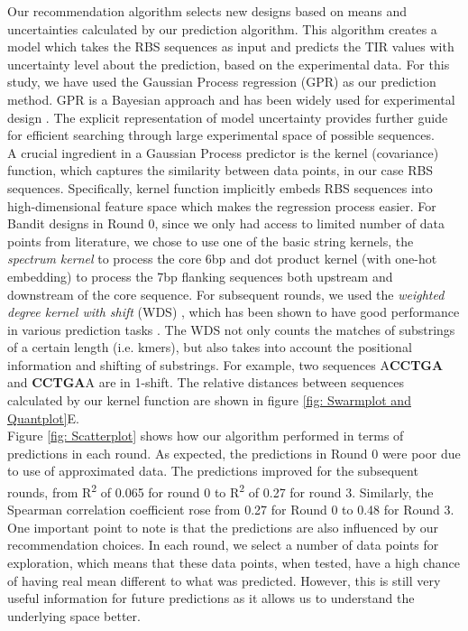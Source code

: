 \documentclass{article}
\newcommand{\maciej}[1]{\textcolor{blue}{#1}}
\begin{document}
Our recommendation algorithm selects new designs based on means and uncertainties calculated by our prediction algorithm.
This algorithm creates a model which takes the RBS sequences as input and predicts the TIR values with uncertainty level about the prediction, based on the experimental data.
For this study, we have used the Gaussian Process regression (GPR) as our prediction method.
GPR is a Bayesian approach and has been widely used for experimental design \cite{srinivas2012information, romero_navigating_2013}.
The explicit representation of model uncertainty provides further guide for efficient searching through large experimental space of possible sequences.\\
A crucial ingredient in a Gaussian Process predictor \cite{Rasmussen2004} is the kernel (covariance) function, which captures the similarity between data points, in our case RBS sequences.
Specifically, kernel function implicitly embeds RBS sequences into high-dimensional feature space which makes the regression process easier.
For Bandit designs in Round 0, since we only had access to limited number of data points from literature, we chose to use one of the basic string kernels, the \textit{spectrum kernel} \cite{leslie2001spectrum} to process the core 6bp and dot product kernel \cite{Rasmussen2004} (with one-hot embedding) to process the 7bp flanking sequences both upstream and downstream of the core sequence.
For subsequent rounds, we used 
the \textit{weighted degree kernel with shift} (WDS) \cite{ratsch_rase_2005_wds}, which has been shown to have good performance in various prediction tasks \cite{Ben-Hur2008}.
The WDS not only counts the matches of substrings of a certain length (i.e. kmers), but also takes into account the positional information and shifting of substrings.
For example, two sequences A\textbf{CCTGA} and \textbf{CCTGA}A are in 1-shift.
The relative distances between sequences calculated by our kernel function are shown in figure \ref{fig: Swarmplot and Quantplot}E.\\

Figure \ref{fig: Scatterplot} shows how our algorithm performed in terms of predictions in each round. 
As expected, the predictions in Round 0 were poor due to use of approximated data. 
The predictions improved for the subsequent rounds, from R\textsuperscript{2} of 0.065 for round 0 to R\textsuperscript{2} of 0.27 for round 3.
Similarly, the Spearman correlation coefficient rose from 0.27 for Round 0 to 0.48 for Round 3.
One important point to note is that the predictions are also influenced by our recommendation choices. 
In each round, we select a number of data points for exploration, which means that these data points, when tested, have a high chance of having real mean different to what was predicted.
However, this is still very useful information for future predictions as it allows us to understand the underlying space better.
    
\end{document}
